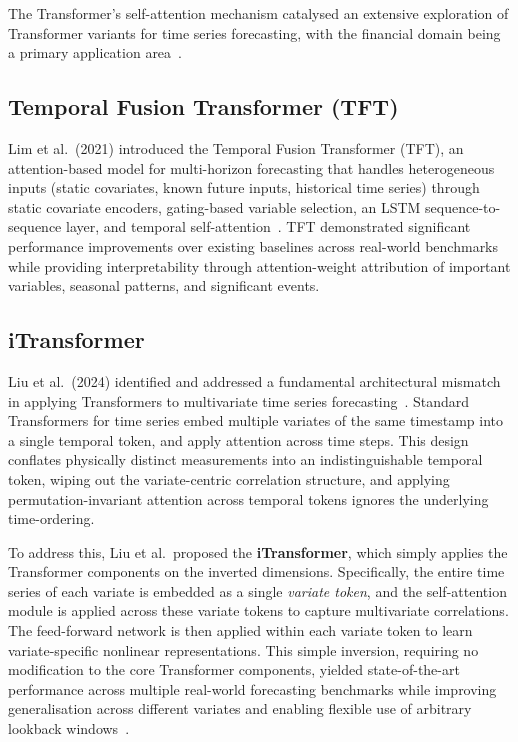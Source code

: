 \documentclass[a4paper,11pt]{report}
\begin{document}
The Transformer's self-attention mechanism catalysed an extensive exploration of Transformer variants for time series forecasting, with the financial domain being a primary application area~\cite{zhu2025msgformer}.

\subsection{Temporal Fusion Transformer (TFT)}

Lim et al.\ (2021) introduced the Temporal Fusion Transformer (TFT), an attention-based model for multi-horizon forecasting that handles heterogeneous inputs (static covariates, known future inputs, historical time series) through static covariate encoders, gating-based variable selection, an LSTM sequence-to-sequence layer, and temporal self-attention~\cite{lim2020tft}. TFT demonstrated significant performance improvements over existing baselines across real-world benchmarks while providing interpretability through attention-weight attribution of important variables, seasonal patterns, and significant events.

\subsection{iTransformer}

Liu et al.\ (2024) identified and addressed a fundamental architectural mismatch in applying Transformers to multivariate time series forecasting~\cite{liu2024itransformer}. Standard Transformers for time series embed multiple variates of the same timestamp into a single temporal token, and apply attention across time steps. This design conflates physically distinct measurements into an indistinguishable temporal token, wiping out the variate-centric correlation structure, and applying permutation-invariant attention across temporal tokens ignores the underlying time-ordering.

To address this, Liu et al.\ proposed the \textbf{iTransformer}, which simply applies the Transformer components on the inverted dimensions. Specifically, the entire time series of each variate is embedded as a single \emph{variate token}, and the self-attention module is applied across these variate tokens to capture multivariate correlations. The feed-forward network is then applied within each variate token to learn variate-specific nonlinear representations. This simple inversion, requiring no modification to the core Transformer components, yielded state-of-the-art performance across multiple real-world forecasting benchmarks while improving generalisation across different variates and enabling flexible use of arbitrary lookback windows~\cite{liu2024itransformer}.
\end{document}
